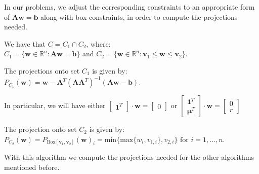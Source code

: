 \documentclass{beamer}
\begin{document}
\begin{frame}


\justifying
In our problems, we adjust the corresponding constraints to an appropriate form of $\mathbf{A}\mathbf{w} = \mathbf{b}$ along with box constraints, in order to compute the projections needed.

\vspace{0.4cm}
\justifying
We have that $C = C_{1}\cap C_{2}$, where:\\
$C_{1} = \{\mathbf{w} \in \mathbb{R}^{n} : \mathbf{A}\mathbf{w} = \mathbf{b}\}$ and $C_{2} = \{\mathbf{w} \in \mathbb{R}^{n} : \mathbf{v}_1 \leq \mathbf{w} \leq \mathbf{v}_2\}$.

\vspace{0.4cm}
\justifying
The projections onto set $C_{1}$ is given by:\\
$P_{C_{1}}(\mathbf{w}) = \mathbf{w} - \mathbf{A}^{T}(\mathbf{A}\mathbf{A}^{T})^{-1}(\mathbf{A}\mathbf{w}-\mathbf{b})$.

\vspace{0.4cm}
\justifying
In particular, we will have either
$\begin{bmatrix}
\mathbf{1}^{T}
\end{bmatrix}
\cdot
\mathbf{w} =
\begin{bmatrix}
0
\end{bmatrix}$
or
$\begin{bmatrix}
\mathbf{1}^{T}\\
\boldsymbol\mu^{T}
\end{bmatrix}
\cdot
\mathbf{w} =
\begin{bmatrix}
0\\
r
\end{bmatrix}$

\vspace{0.4cm}
\justifying
The projection onto set $C_{2}$ is given by:\\
$P_{C_2}(\mathbf{w}) = P_{\text{Box}[\mathbf{v}_1,\mathbf{v}_2]}(\mathbf{w})_i = \text{min}\{\text{max}\{w_i,v_{1,i}\},v_{2,i}\} \text{ for } i = 1, \dots, n$.

\vspace{0.4cm}
\justifying
With this algorithm we compute the projections needed for the other algorithms mentioned before.

\end{frame}
\end{document}
